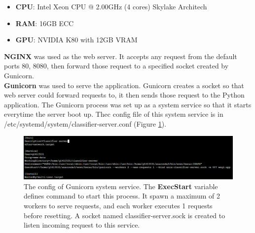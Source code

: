 \begin{itemize}
	\item \textbf{CPU}: Intel Xeon CPU @ 2.00GHz (4 cores) Skylake Architech
	\item \textbf{RAM}: 16GB ECC 
	\item \textbf{GPU}: NVIDIA K80 with 12GB VRAM
\end{itemize}
\textbf{NGINX} was used as the web server. It accepts any request from the default ports 80, 8080, then forward those request to a specified socket created by Gunicorn.\\
\textbf{Gunicorn} was used to serve the application. Gunicorn creates a socket so that web server could forward requests to, it then sends those request to the Python application. The Gunicorn process was set up as a system service so that it starts everytime the server boot up. Thec config file of this system service is in /etc/systemd/system/classifier-server.conf (Figure \ref{chap4:server_config}).
\begin{center}
    \begin{figure}[H]
    \centering
    \includegraphics[width=1\columnwidth]{images/chap4/server_config.png}
	\caption{The config of Gunicorn system service. The \textbf{ExecStart} variable defines command to start this process. It spawn a maximum of 2 workers to serve requests, and each worker executes 1 requests before resetting. A socket named classifier-server.sock  is created to listen incoming request to this service.}   
	\label{chap4:server_config}
    \end{figure}
\end{center}

